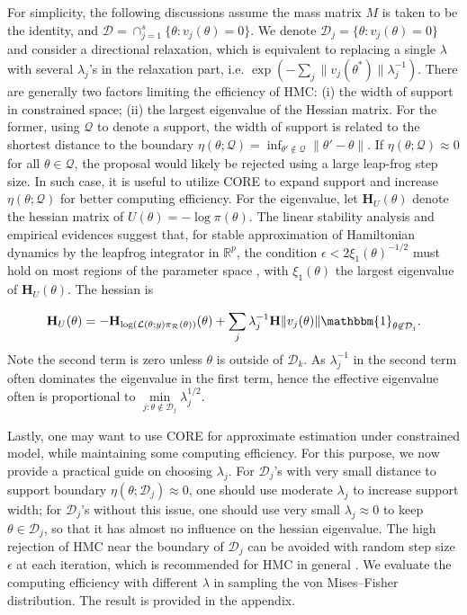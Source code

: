 \documentclass[10pt,fleqn]{article} \pdfoutput=1
\newcommand{\bb}[1]{\mathbb{#1}} \newcommand{\mc}[1]{\mathcal{#1}}
\DeclareMathOperator{\1}{\mathbbm{1}} \DeclareMathOperator{\bigO}{\mc O}
\newcommand{\dt}{\epsilon} %
\newcommand{\mass}{M} %
\newcommand{\hess}{\mathbf{H}} %
\begin{document}
For simplicity, the following discussions assume the mass matrix $\mass$ is
taken to be the identity, and $\mc D= \cap_{j=1}^s\{\theta :v_j(\theta)=0 \}$.
We denote $\mc D_j= \{\theta :v_j(\theta)=0 \}$ and consider a directional
relaxation, which is equivalent to replacing a single $\lambda$ with several
$\lambda_j$'s in the relaxation part, i.e. $\exp(-\sum_j{\|v_j(\theta^*)\|}{\lambda_j^{-1}})$. There are generally two factors limiting the efficiency of HMC:
(i) the width of support in constrained space; (ii) the largest eigenvalue of the Hessian matrix.
For the former, using $\mc Q$ to denote a support, the width of support is related to the shortest
distance to the boundary $\eta (\theta; {\mc Q})= \inf_{\theta'\not\in \mc
Q}\|\theta'-\theta\|$. If $\eta (\theta; {\mc Q}) \approx 0$ for all $\theta\in \mc Q$,
the proposal would likely be rejected using a large leap-frog step size. In such case,
it is useful to utilize CORE to expand support and
increase $\eta (\theta; {\mc Q})$ for better computing efficiency. For the eigenvalue,
let $\hess_U(\theta)$ denote the hessian matrix of
$U(\theta) = - \log \pi(\theta)$.
The linear stability analysis and
empirical evidences suggest that, for stable approximation of Hamiltonian
dynamics by the leapfrog integrator in $\bb R^p$, the condition $\dt <
2\xi_1(\theta)^{-1/2}$ must hold on most regions of the parameter space
\citep{hairer06}, with $\xi_1(\theta)$ the largest
eigenvalue of $\hess_U(\theta)$. The hessian is

\begin{equation} \label{eq:hessian_extrinsic}
\hess_U(\theta) = -\hess_{\log
(\mathcal L(\theta;y) \pi_{\mc R}(\theta))
}(\theta)+\sum_j \lambda_j^{-1} \hess {\|v_j(\theta)\|}
\mathbbm{1}_{\theta\not\in \mc D_j}. \end{equation}
Note the second term is zero unless $\theta$ is outside of $\mc D_k$. As $\lambda^{-1}_j$ in the
second term often dominates the eigenvalue in the first term, hence the effective eigenvalue often is
proportional to $ \underset{j: \theta \not\in \mc D_j}{\min}\lambda_j^{1/2}$.

Lastly, one may want to use CORE for approximate estimation under constrained
model, while maintaining some computing efficiency.
For this purpose, we now provide a practical guide on choosing $\lambda_j$.  For $\mc
D_j$'s with very small distance to support boundary $\eta(\theta;\mc D_j)\approx 0$, one should use moderate $\lambda_j$
to increase support width;  for $\mc D_j$'s
without this issue, one should use very small $\lambda_j\approx 0$ to keep $\theta\in\mc D_j$, so that it has almost no influence on the hessian eigenvalue.
The high rejection of HMC near the boundary of $\mc D_j$ can be avoided with random step size $\epsilon$ at each iteration, which is recommended for HMC in general \citep{livingstone2016geometric}. We evaluate the computing efficiency with different $\lambda$ in sampling the von Mises--Fisher distribution. The result is provided in the appendix.
\end{document}
